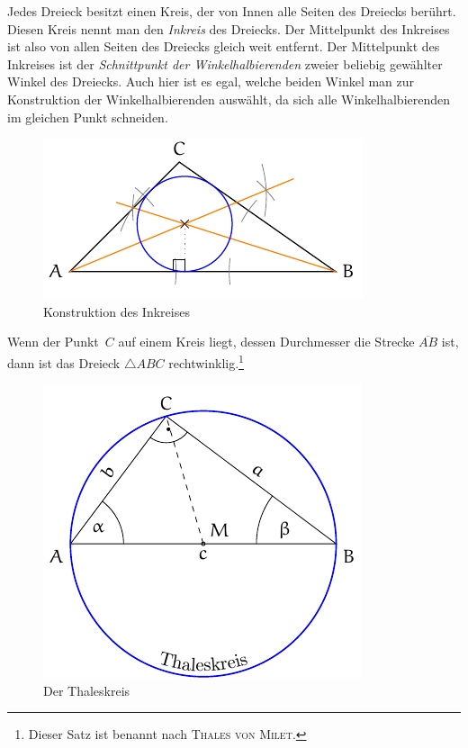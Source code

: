 \begin{regel}[Inkreis]
 Jedes Dreieck besitzt einen Kreis, der von Innen alle Seiten des Dreiecks berührt. Diesen Kreis nennt man den \emph{Inkreis} des Dreiecks. Der Mittelpunkt des Inkreises ist also von allen Seiten des Dreiecks gleich weit entfernt. Der Mittelpunkt des Inkreises ist der \emph{Schnittpunkt der Winkelhalbierenden} zweier beliebig gewählter Winkel des Dreiecks. Auch hier ist es egal, welche beiden Winkel man zur Konstruktion der Winkelhalbierenden auswählt, da sich alle Winkelhalbierenden im gleichen Punkt schneiden.
 
 \begin{figure}[ht]
 \centering
 \includegraphics{./inkreis.pdf}
 \caption{Konstruktion des Inkreises}
 \label{fig:inkreis}
\end{figure}

 
\end{regel}

\begin{satz}
 Wenn der Punkt~\(C\) auf einem Kreis liegt, dessen Durchmesser die Strecke \(\overline{AB}\) ist, dann ist das Dreieck \(\triangle ABC\) rechtwinklig.\footnote{Dieser Satz ist benannt nach \textsc{Thales von Milet}.}
\end{satz}

\begin{figure}[htp]
 \centering
 \includegraphics{./thaleskreis.pdf}
 \caption{Der Thaleskreis}
 \label{fig:thaleskreis}
\end{figure}


